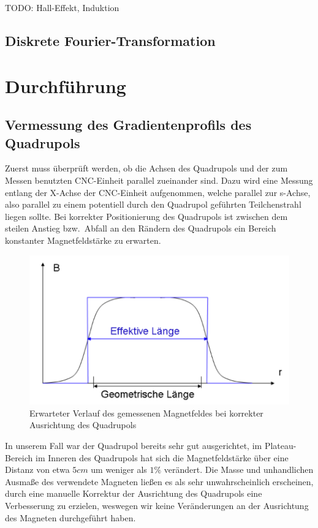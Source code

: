 \documentclass[bigchapter,colorback,accentcolor=tud4b,linedtoc,11pt]{tudreport}
\begin{document}
TODO: Hall-Effekt, Induktion

\section{Diskrete Fourier-Transformation}


\chapter{Durchführung}
\section{Vermessung des Gradientenprofils des Quadrupols}

Zuerst muss überprüft werden, ob die Achsen des Quadrupols und der zum Messen benutzten CNC-Einheit parallel zueinander sind. Dazu wird eine Messung entlang der X-Achse der CNC-Einheit aufgenommen, welche parallel zur s-Achse, also parallel zu einem potentiell durch den Quadrupol geführten Teilchenstrahl liegen sollte. Bei korrekter Positionierung des Quadrupols ist zwischen dem steilen Anstieg bzw.\ Abfall an den Rändern des Quadrupols ein Bereich konstanter Magnetfeldstärke zu erwarten.
\begin{figure}[H]
\centering
\includegraphics[width=130mm]{img/magnetfeldplateau.png}
\caption{Erwarteter Verlauf des gemessenen Magnetfeldes bei korrekter Ausrichtung des Quadrupols \cite{anleitung}}
\end{figure}
In unserem Fall war der Quadrupol bereits sehr gut ausgerichtet, im Plateau-Bereich im Inneren des Quadrupols hat sich die Magnetfeldstärke über eine Distanz von etwa $5 cm$ um weniger als $1\%$ verändert. Die Masse und unhandlichen Ausmaße des verwendete Magneten ließen es als sehr unwahrscheinlich erscheinen, durch eine manuelle Korrektur der Ausrichtung des Quadrupols eine Verbesserung zu erzielen, weswegen wir keine Veränderungen an der Ausrichtung des Magneten durchgeführt haben.
\end{document}

